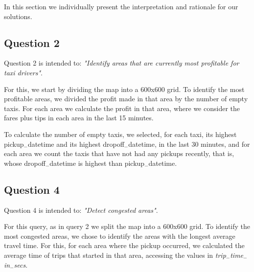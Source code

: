 In this section we individually present the interpretation and rationale for our solutions.

\subsection{Question 2}

Question 2 is intended to: \textit{"Identify areas that are currently most profitable for taxi drivers"}.\par
For this, we start by dividing the map into a 600x600 grid. To identify the most profitable areas, we divided the profit made in that area by the number of empty taxis.
For each area we calculate the profit in that area, where we consider the fares plus tips in each area in the last 15 minutes.\par
To calculate the number of empty taxis, we selected, for each taxi, its highest pickup$_-$datetime and its highest dropoff$_-$datetime, in the last 30 minutes, and for each area we count the taxis that have not had any pickups recently, that is, whose dropoff$_-$datetime is highest than pickup$_-$datetime.\par

\subsection{Question 4}

Question 4 is intended to: \textit{"Detect congested areas"}.\par
For this query, as in query 2 we split the map into a 600x600 grid. To identify the most congested areas, we chose to identify the areas with the longest average travel time. For this, for each area where the pickup occurred, we calculated the average time of trips that started in that area, accessing the values in \textit{trip$_-$time$_-$in$_-$secs}. 